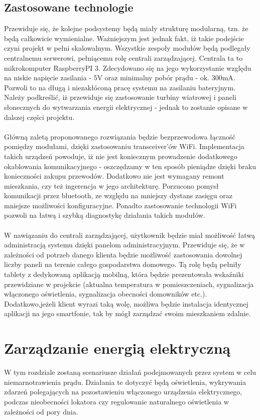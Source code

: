 \documentclass[12pt]{article} %
\begin{document}
\subsection{Zastosowane technologie}
Przewiduje się, że kolejne podsystemy będą miały strukturę modularną, tzn. że będą całkowicie wymienialne. Ważniejszym jest jednak fakt, iż takie podejście czyni projekt w pełni skalowalnym. Wszystkie zespoły modułów będą podlegały centralnemu serwerowi, pełniącemu rolę centrali zarządzającej. Centrala ta to mikrokomputer RaspberryPI 3. Zdecydowano się na jego wykorzystanie względu na niskie napięcie zasilania - 5V oraz minimalny pobór prądu - ok. 300mA. Pozwoli to na długą i niezakłóconą pracę systemu na zasilaniu bateryjnym. Należy podkreślić, iż przewiduje się zastosowanie turbiny wiatrowej i paneli słonecznych do wytwarzania energii elektrycznej - jednak to zostanie opisane w dalszej części projektu.
\\ \\
Główną zaletą proponowanego rozwiązania będzie bezprzewodowa łączność pomiędzy modułami, dzięki zastosowaniu transceiver'ów WiFi. Implementacja takich urządzeń powoduje, iż nie jest koniecznym prowadzenie dodatkowego okablowania komunikacyjnego - oszczędzamy w ten sposób pieniądze dzięki braku konieczności zakupu przewodów. Dodatkowo nie jest wymagany remont mieszkania, czy też ingerencja w jego architekturę. Porzucono pomysł komunikacji przez bluetooth, ze względu na mniejszy dystans zasięgu oraz mniejsze możliwości konfiguracyjne.
Ponadto zastosowanie technologii WiFi pozwoli na łatwą i szybką diagnostykę działania takich modułów.
\\ \\ 
W nawiązaniu do centrali zarządzającej, użytkownik będzie miał możliwość łatwą administracją systemu dzięki panelom administracyjnym. Przewiduje się, że w zależności od potrzeb danego klienta będzie możliwość zastosowania dowolnej liczby paneli na terenie całego gospodarstwa domowego. Tą rolę będą pełniły tablety z dedykowaną aplikacją mobilną, która będzie prezentowała wskaźniki przewidziane w projekcie (aktualna temperatura w pomieszczeniach, sygnalizacja włączonego oświetlenia, sygnalizacja obecności domowników etc.). Dodatkowo,jeżeli klient wyrazi taką wolę, możliwa będzie instalacja identycznej aplikacji na jego smartfonie, tak by mógł zarządzać swoim mieszkaniem zdalnie.

\section{Zarządzanie energią elektryczną}
W tym rozdziale zostaną scenariusze działań podejmowanych przez system w celu niemarnotrawienia prądu. Działania te dotyczyć będą oświetlenia, wykrywania zdarzeń polegających na pozostawieniu włączonego urządzenia elektrycznego, podczas nieobecności lokatora czy regulowanie naturalnego oświetlenia w zależności od pory dnia.
\end{document}
